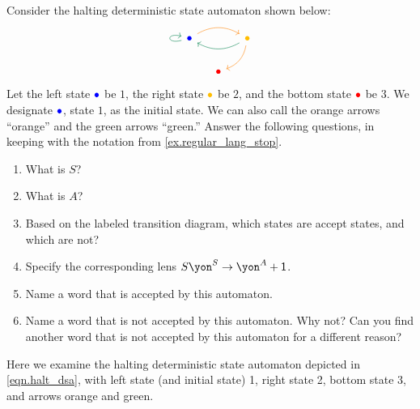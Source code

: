 \documentclass[Book-Poly]{subfiles}
\begin{document}
\begin{exercise}\label{exc.halt_dsa}
Consider the halting deterministic state automaton shown below:
\begin{equation} \label{eqn.halt_dsa}
\begin{tikzcd}[column sep=small]
	\bul[blue]\ar[rr, bend left, orange]\ar[loop left, dgreen]&&
	\bul[dyellow]\ar[dl, bend left, orange]\ar[ll, dgreen, bend left]\\&
	\bul[red]
\end{tikzcd}
\end{equation}
Let the left state $\bul[blue]$ be $1$, the right state $\bul[dyellow]$ be $2$, and the bottom state $\bul[red]$ be $3$.
We designate $\bul[blue]$, state $1$, as the initial state.
We can also call the orange arrows ``{\color{orange}orange}'' and the green arrows ``{\color{dgreen}green}.''
Answer the following questions, in keeping with the notation from \cref{ex.regular_lang_stop}.

\begin{enumerate}
	\item What is $S$?
	\item What is $A$?
	\item Based on the labeled transition diagram, which states are accept states, and which are not?
	\item Specify the corresponding lens $S\yon^S\to\yon^A+\1$.
	\item Name a word that is accepted by this automaton.
	\item Name a word that is not accepted by this automaton.
	Why not?
	Can you find another word that is not accepted by this automaton for a different reason?
\qedhere
\end{enumerate}
\begin{solution}
Here we examine the halting deterministic state automaton depicted in \eqref{eqn.halt_dsa}, with left state (and initial state) 1, right state 2, bottom state 3, and arrows {\color{orange}orange} and {\color{dgreen}green}.


\end{solution}
\end{exercise}
\end{document}
